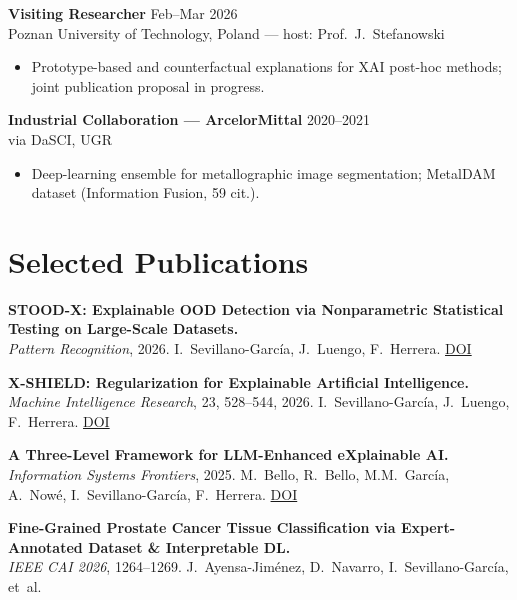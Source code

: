 \documentclass[10pt,a4paper]{article}
\begin{document}
\begin{minipage}[t]{0.64\textwidth}
\textbf{Visiting Researcher} \hfill Feb--Mar 2026 \\
\textcolor{subtle}{\footnotesize Poznan University of Technology, Poland --- host: Prof.~J.~Stefanowski}
\begin{itemize}
    \item Prototype-based and counterfactual explanations for XAI post-hoc methods; joint publication proposal in progress.
\end{itemize}

\textbf{Industrial Collaboration --- ArcelorMittal} \hfill 2020--2021 \\
\textcolor{subtle}{\footnotesize via DaSCI, UGR}
\begin{itemize}
    \item Deep-learning ensemble for metallographic image segmentation; MetalDAM dataset (Information Fusion, 59 cit.).
\end{itemize}

\vspace{0.3em}

\section*{Selected Publications}

\footnotesize

\textbf{STOOD-X: Explainable OOD Detection via Nonparametric Statistical Testing on Large-Scale Datasets.} \\
\textcolor{subtle}{\textit{Pattern Recognition}, 2026. I.~Sevillano-García, J.~Luengo, F.~Herrera. \href{https://doi.org/10.1016/j.patcog.2026.113254}{DOI}}

\textbf{X-SHIELD: Regularization for Explainable Artificial Intelligence.} \\
\textcolor{subtle}{\textit{Machine Intelligence Research}, 23, 528--544, 2026. I.~Sevillano-García, J.~Luengo, F.~Herrera. \href{https://doi.org/10.1007/s11633-025-1576-y}{DOI}}

\textbf{A Three-Level Framework for LLM-Enhanced eXplainable AI.} \\
\textcolor{subtle}{\textit{Information Systems Frontiers}, 2025. M.~Bello, R.~Bello, M.M.~García, A.~Nowé, I.~Sevillano-García, F.~Herrera. \href{https://doi.org/10.1007/s10796-025-10668-1}{DOI}}

\textbf{Fine-Grained Prostate Cancer Tissue Classification via Expert-Annotated Dataset \& Interpretable DL.} \\
\textcolor{subtle}{\textit{IEEE CAI 2026}, 1264--1269. J.~Ayensa-Jiménez, D.~Navarro, I.~Sevillano-García, et~al.}


\end{minipage}
\end{document}
